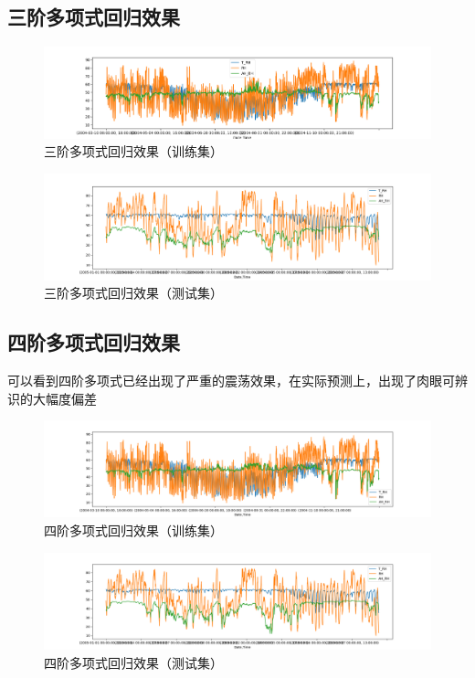\documentclass{ctexart}
\begin{document}
\subsection{三阶多项式回归效果}
\begin{figure}[H]
	\includegraphics[width=1.2\textwidth]{../images/poly3.png}
	\caption{三阶多项式回归效果（训练集）}
\end{figure}
\begin{figure}[H]
	\includegraphics[width=1.2\textwidth]{../images/poly4.png}
	\caption{三阶多项式回归效果（测试集）}
\end{figure}
\subsection{四阶多项式回归效果}
可以看到四阶多项式已经出现了严重的震荡效果，在实际预测上，出现了肉眼可辨识的大幅度偏差
\begin{figure}[H]
	\includegraphics[width=1.2\textwidth]{../images/poly5.png}
	\caption{四阶多项式回归效果（训练集）}
\end{figure}
\begin{figure}[H]
	\includegraphics[width=1.2\textwidth]{../images/poly6.png}
	\caption{四阶多项式回归效果（测试集）}
\end{figure}
\end{document}
